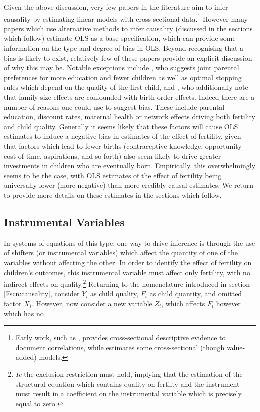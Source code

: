 Given the above discussion, very few papers in the literature aim to infer 
causality by estimating linear models with cross-sectional data.\footnote{
Early work, such as \citet{Desai1995}, provides cross-sectional descriptive 
evidence to document correlations, while \citet{Hanushek1992} estimates some
cross-sectional (though value-added) models.}  However many papers which use 
alternative methods to infer causality (discussed in the sections which follow)
estimate OLS as a base specification, which can provide some information on the 
type and degree of bias in OLS.  Beyond recognising that a bias is likely to 
exist, relatively few of these papers provide an explicit discussion of why this
may be.  Notable exceptions include \citet{Qian2009}, who suggests joint
parental preferences for more education and fewer children as well as optimal
stopping rules which depend on the quality of the first child, and 
\citet{Blacketal2010}, who additionally note that family size effects are 
confounded with birth order effects.  Indeed there are a number of reasons one
could use to suggest bias.  These include parental education, discount rates,
maternal health or network effects driving both fertility and child quality.  
Generally it seems likely that these factors will cause OLS estimates to 
induce a negative bias in estimates of the effect of fertility, given that 
factors which lead to fewer births (contraceptive knowledge, opportunity cost of
time, aspirations, and so forth) also seem likely to drive greater investments 
in children who are eventually born.  Empirically, this overwhelmingly seems to
be the case, with OLS estimates of the effect of fertility being universally 
lower (more negative) than more credibly causal estimates.  We return to provide
more details on these estimates in the sections which follow.

\subsection{Instrumental Variables}
In systems of equations of this type, one way to drive inference is through the
use of shifters (or instrumental variables) which affect the quantity of one of
the variables without affecting the other.  In order to identify the effect of 
fertility on children's outcomes, this instrumental variable must affect only 
fertility, with no indirect effects on quality.\footnote{\emph{Ie} the exclusion 
restriction must hold, implying that the estimation of the structural equation 
which contains quality on fertilty and the instrument must result in a 
coefficient on the instrumental variable which is precisely equal to zero.}
Returning to the nomenclature introduced in section \ref{Fscn:causality},
consider $Y_i$ as child quality, $F_i$ as child quantity, and omitted factor
$X_i$.  However, now consider a new variable $Z_i$, which affects $F_i$ however
which has no 

